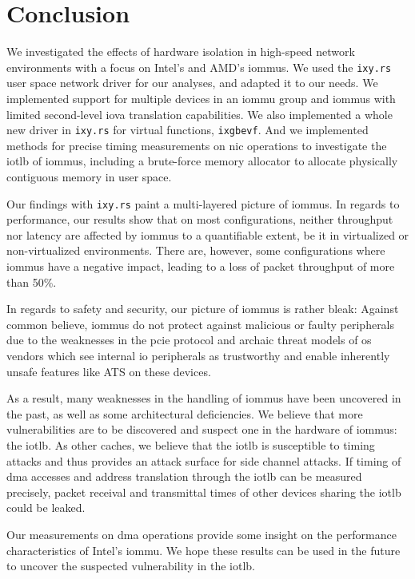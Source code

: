 \chapter{Conclusion}
\label{chap:conclusion}

We investigated the effects of hardware isolation in high-speed network
environments with a focus on Intel's and AMD's \acp{iommu}. We used the
\texttt{ixy.rs} user space network driver for our analyses, and adapted it to
our needs. We implemented support for multiple devices in an \ac{iommu} group
and \acp{iommu} with limited second-level \ac{iova} translation capabilities. We
also implemented a whole new driver in \texttt{ixy.rs} for virtual functions,
\texttt{ixgbevf}. And we implemented methods for precise timing measurements on
\ac{nic} operations to investigate the \ac{iotlb} of \acp{iommu}, including a
brute-force memory allocator to allocate physically contiguous memory in user
space.

Our findings with \texttt{ixy.rs} paint a multi-layered picture of \acp{iommu}.
In regards to performance, our results show that on most configurations, neither
throughput nor latency are affected by \acp{iommu} to a quantifiable extent, be
it in virtualized or non-virtualized environments. There are, however, some
configurations where \acp{iommu} have a negative impact, leading to a loss of
packet throughput of more than 50\%.

In regards to safety and security, our picture of \acp{iommu} is rather bleak:
Against common believe, \acp{iommu} do not protect against malicious or faulty
peripherals due to the weaknesses in the \ac{pcie} protocol and archaic threat
models of \ac{os} vendors which see internal \ac{io} peripherals as trustworthy
and enable inherently unsafe features like ATS on these devices.

As a result, many weaknesses in the handling of \acp{iommu} have been uncovered
in the past, as well as some architectural deficiencies. We believe that more
vulnerabilities are to be discovered and suspect one in the hardware of
\acp{iommu}: the \ac{iotlb}. As other caches, we believe that the \ac{iotlb} is
susceptible to timing attacks and thus provides an attack surface for side
channel attacks. If timing of \ac{dma} accesses and address translation through
the \ac{iotlb} can be measured precisely, packet receival and transmittal times
of other devices sharing the \ac{iotlb} could be leaked.

Our measurements on \ac{dma} operations provide some insight on the performance
characteristics of Intel's \ac{iommu}. We hope these results can be used in the
future to uncover the suspected vulnerability in the \ac{iotlb}.

